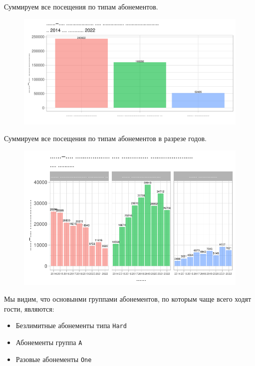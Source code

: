 \documentclass[
  letterpaper,
  DIV=11,
  numbers=noendperiod]{scrartcl}
\begin{document}
Суммируем все посещения по типам абонементов.

\begin{figure}

{\centering \includegraphics{./intro_files/figure-pdf/unnamed-chunk-16-1.pdf}

}

\end{figure}

Суммируем все посещения по типам абонементов в разрезе годов.

\begin{figure}

{\centering \includegraphics{./intro_files/figure-pdf/unnamed-chunk-17-1.pdf}

}

\end{figure}

Мы видим, что основынми группами абонементов, по которым чаще всего
ходят гости, являются:

\begin{itemize}
\item
  Безлимитные абонементы типа \texttt{Hard}
\item
  Абонементы группа \texttt{А}
\item
  Разовые абонементы \texttt{One}
\end{itemize}
\end{document}
